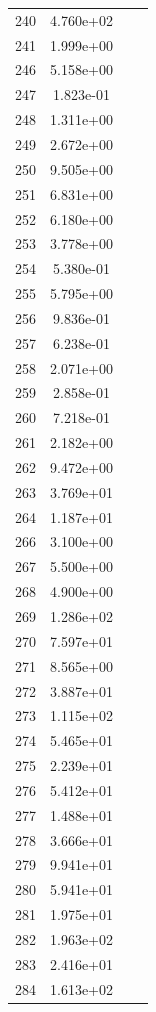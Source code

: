 \documentclass[12pt]{article}
\begin{document}
\begin{longtable}{@{}cccc@{}}
240 & 4.760e+02 &  &  \\
241 & 1.999e+00 &  &  \\
246 & 5.158e+00 &  &  \\
247 & 1.823e-01 &  &  \\
248 & 1.311e+00 &  &  \\
249 & 2.672e+00 &  &  \\
250 & 9.505e+00 &  &  \\
251 & 6.831e+00 &  &  \\
252 & 6.180e+00 &  &  \\
253 & 3.778e+00 &  &  \\
254 & 5.380e-01 &  &  \\
255 & 5.795e+00 &  &  \\
256 & 9.836e-01 &  &  \\
257 & 6.238e-01 &  &  \\
258 & 2.071e+00 &  &  \\
259 & 2.858e-01 &  &  \\
260 & 7.218e-01 &  &  \\
261 & 2.182e+00 &  &  \\
262 & 9.472e+00 &  &  \\
263 & 3.769e+01 &  &  \\
264 & 1.187e+01 &  &  \\
266 & 3.100e+00 &  &  \\
267 & 5.500e+00 &  &  \\
268 & 4.900e+00 &  &  \\
269 & 1.286e+02 &  &  \\
270 & 7.597e+01 &  &  \\
271 & 8.565e+00 &  &  \\
272 & 3.887e+01 &  &  \\
273 & 1.115e+02 &  &  \\
274 & 5.465e+01 &  &  \\
275 & 2.239e+01 &  &  \\
276 & 5.412e+01 &  &  \\
277 & 1.488e+01 &  &  \\
278 & 3.666e+01 &  &  \\
279 & 9.941e+01 &  &  \\
280 & 5.941e+01 &  &  \\
281 & 1.975e+01 &  &  \\
282 & 1.963e+02 &  &  \\
283 & 2.416e+01 &  &  \\
284 & 1.613e+02 &  &  \\

\end{longtable}
\end{document}
